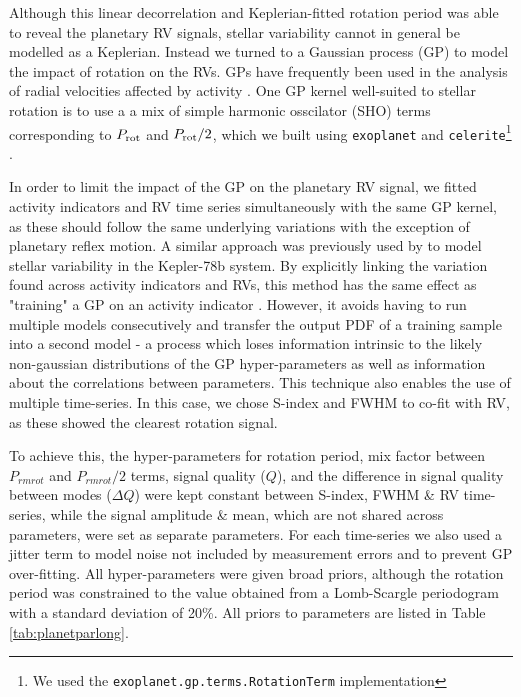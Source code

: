 \documentclass[fleqn,usenatbib]{mnras}
\begin{document}
Although this linear decorrelation and Keplerian-fitted rotation period was able to reveal the planetary RV signals, stellar variability cannot in general be modelled as a Keplerian.
Instead we turned to a Gaussian process (GP) to model the impact of rotation on the RVs.
GPs have frequently been used in the analysis of radial velocities affected by activity \citep[e.g.][]{2014MNRAS.443.2517H,2019A&A...627A..43D}.
One GP kernel well-suited to stellar rotation is to use a a mix of simple harmonic osscilator (SHO) terms corresponding to $P_{\rm rot}$ and $P_{\rm rot}/2$, which we built using \texttt{exoplanet} and \texttt{celerite}\footnote{We used the \texttt{exoplanet.gp.terms.RotationTerm} implementation} \citep{exoplanet:foremanmackey17}.

In order to limit the impact of the GP on the planetary RV signal, we fitted activity indicators and RV time series simultaneously with the same GP kernel, as these should follow the same underlying variations with the exception of planetary reflex motion.
A similar approach was previously used by \citet{grunblatt2015determining} to model stellar variability in the Kepler-78b system.
By explicitly linking the variation found across activity indicators and RVs, this method has the same effect as "training" a GP on an activity indicator \citep[e.g.][]{2019A&A...627A..43D}.
However, it avoids having to run multiple models consecutively and transfer the output PDF of a training sample into a second model - a process which loses information intrinsic to the likely non-gaussian distributions of the GP hyper-parameters as well as information about the correlations between parameters.
This technique also enables the use of multiple time-series.
In this case, we chose S-index and FWHM to co-fit with RV, as these showed the clearest rotation signal.

To achieve this, the hyper-parameters for rotation period, mix factor between $P_{rm rot}$ and $P_{rm rot}/2$ terms, signal quality ($Q$), and the difference in signal quality between modes ($\Delta Q$) were kept constant between S-index, FWHM \& RV time-series, while the signal amplitude \& mean, which are not shared across parameters, were set as separate parameters.
For each time-series we also used a jitter term to model noise not included by measurement errors and to prevent GP over-fitting.
All hyper-parameters were given broad priors, although the rotation period was constrained to the value obtained from a Lomb-Scargle periodogram with a standard deviation of 20\%.
All priors to parameters are listed in Table \ref{tab:planetparlong}.
\end{document}
